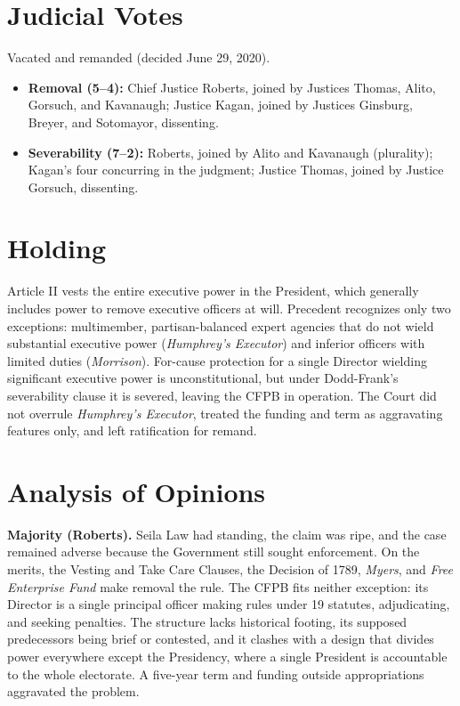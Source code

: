 \documentclass[12pt]{article}
\begin{document}
\section{Judicial Votes}

Vacated and remanded (decided June 29, 2020).
\begin{itemize}
\item \textbf{Removal (5--4):} Chief Justice Roberts, joined by Justices Thomas, Alito, Gorsuch, and Kavanaugh; Justice Kagan, joined by Justices Ginsburg, Breyer, and Sotomayor, dissenting.
\item \textbf{Severability (7--2):} Roberts, joined by Alito and Kavanaugh (plurality); Kagan's four concurring in the judgment; Justice Thomas, joined by Justice Gorsuch, dissenting.
\end{itemize}

\section{Holding}

Article II vests the entire executive power in the President, which generally includes power to remove executive officers at will. Precedent recognizes only two exceptions: multimember, partisan-balanced expert agencies that do not wield substantial executive power (\textit{Humphrey's Executor}) and inferior officers with limited duties (\textit{Morrison}). For-cause protection for a single Director wielding significant executive power is unconstitutional, but under Dodd-Frank's severability clause it is severed, leaving the CFPB in operation. The Court did not overrule \textit{Humphrey's Executor}, treated the funding and term as aggravating features only, and left ratification for remand.

\section{Analysis of Opinions}

\textbf{Majority (Roberts).} Seila Law had standing, the claim was ripe, and the case remained adverse because the Government still sought enforcement. On the merits, the Vesting and Take Care Clauses, the Decision of 1789, \textit{Myers}, and \textit{Free Enterprise Fund} make removal the rule. The CFPB fits neither exception: its Director is a single principal officer making rules under 19 statutes, adjudicating, and seeking penalties. The structure lacks historical footing, its supposed predecessors being brief or contested, and it clashes with a design that divides power everywhere except the Presidency, where a single President is accountable to the whole electorate. A five-year term and funding outside appropriations aggravated the problem.
\end{document}
